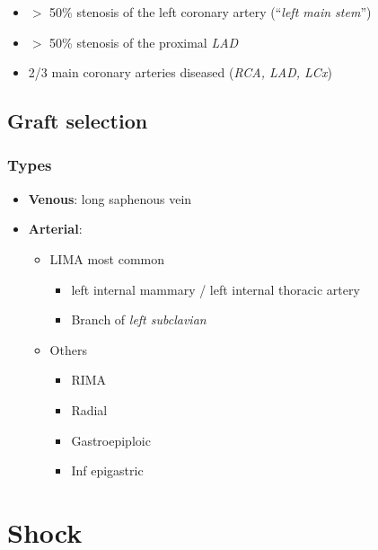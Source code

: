 \documentclass[
  12pt,
]{memoir}
\providecommand{\tightlist}{%
  \setlength{\itemsep}{0pt}\setlength{\parskip}{0pt}}
\begin{document}
\begin{itemize}
\tightlist
\item
  \(>\) 50\% stenosis of the left coronary artery (``\emph{left main
  stem}'')
\item
  \(>\) 50\% stenosis of the proximal \emph{LAD}
\item
  2/3 main coronary arteries diseased (\emph{RCA, LAD, LCx})
\end{itemize}

\hypertarget{graft-selection}{%
\section{Graft selection}\label{graft-selection}}

\hypertarget{types}{%
\subsection{Types}\label{types}}

\begin{itemize}
\tightlist
\item
  \textbf{Venous}: long saphenous vein
\item
  \textbf{Arterial}:

  \begin{itemize}
  \tightlist
  \item
    LIMA most common

    \begin{itemize}
    \tightlist
    \item
      left internal mammary / left internal thoracic artery
    \item
      Branch of \emph{left subclavian}
    \end{itemize}
  \item
    Others

    \begin{itemize}
    \tightlist
    \item
      RIMA
    \item
      Radial
    \item
      Gastroepiploic
    \item
      Inf epigastric
    \end{itemize}
  \end{itemize}
\end{itemize}

\pagebreak

\hypertarget{shock}{%
\chapter{Shock}\label{shock}}
\end{document}
